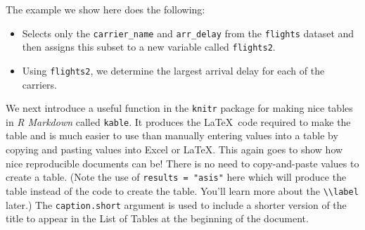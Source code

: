 \documentclass[12pt,twoside]{reedthesis}
\begin{document}
  The example we show here does the following:
  
  \begin{itemize}
  \item
    Selects only the \texttt{carrier\_name} and \texttt{arr\_delay} from
    the \texttt{flights} dataset and then assigns this subset to a new
    variable called \texttt{flights2}.
  \item
    Using \texttt{flights2}, we determine the largest arrival delay for
    each of the carriers.
  \end{itemize}
  
  \begin{Shaded}
  \end{Shaded}
  
  We next introduce a useful function in the \texttt{knitr} package for
  making nice tables in \emph{R Markdown} called \texttt{kable}. It
  produces the \LaTeX~code required to make the table and is much easier
  to use than manually entering values into a table by copying and pasting
  values into Excel or \LaTeX. This again goes to show how nice
  reproducible documents can be! There is no need to copy-and-paste values
  to create a table. (Note the use of \texttt{results\ =\ "asis"} here
  which will produce the table instead of the code to create the table.
  You'll learn more about the
  \texttt{\textbackslash{}\textbackslash{}label} later.) The
  \texttt{caption.short} argument is used to include a shorter version of
  the title to appear in the List of Tables at the beginning of the
  document.
  
  \begin{Shaded}
  \begin{Highlighting}[]
   \NormalTok{(}\NormalTok{, }\NormalTok{),}
         \CharTok{\textbackslash{}\textbackslash{}}\NormalTok{,}
         \NormalTok{)}
  \end{Highlighting}
  \end{Shaded}
  
\end{document}
